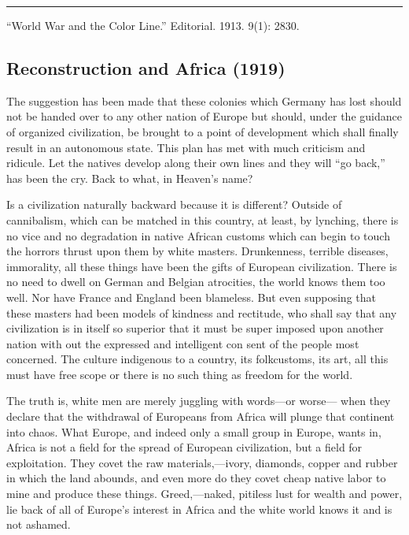 \documentclass[letterpaper,10pt,english]{jupyterBook}
\begin{document}
\bigskip\hrule\bigskip


\sphinxAtStartPar
“World War and the Color Line.” Editorial. 1913.  9(1): 28\sphinxhyphen{}30.


\subsection{Reconstruction and Africa (1919)}
\label{\detokenize{Volumes/17/04/reconstruction_and_africa:reconstruction-and-africa-1919}}\label{\detokenize{Volumes/17/04/reconstruction_and_africa::doc}}
\ignorespaces 
{}\ignorespaces 
\sphinxAtStartPar
The suggestion has been made that these colonies which Germany has lost should not be handed over to any other nation of Europe but should, under the guidance of organized civilization, be brought to a point of development which shall finally result in an autonomous state. This plan has met with much criticism and ridicule. Let the natives develop along their own lines and they will “go back,” has been the cry. Back to what, in Heaven’s name?

\sphinxAtStartPar
Is a civilization naturally backward because it is different? Outside of cannibalism, which can be matched in this country, at least, by lynching, there is no vice and no degradation in native African customs which can begin to touch the horrors thrust upon them by white masters. Drunkenness, terrible diseases, immorality, all these things have been the gifts of European civilization. There is no need to dwell on German and Belgian atrocities, the world knows them too well. Nor have France and England been blameless. But even supposing that these masters had been models of kindness and rectitude, who shall say that any civilization is in itself so superior that it must be super­ imposed upon another nation with­ out the expressed and intelligent con­ sent of the people most concerned. The culture indigenous to a country, its folk\sphinxhyphen{}customs, its art, all this must have free scope or there is no such thing as freedom for the world.

\sphinxAtStartPar
The truth is, white men are merely juggling with words—or worse— when they declare that the withdrawal of Europeans from Africa will plunge that continent into chaos. What Europe, and indeed only a small group in Europe, wants in, Africa is not a field for the spread of European civilization, but a field for exploita­tion. They covet the raw materials,—ivory, diamonds, copper and rubber in which the land abounds, and even more do they covet cheap native labor to mine and produce these things. Greed,—naked, pitiless lust for wealth and power, lie back of all of Europe’s interest in Africa and the white world knows it and is not ashamed.
\end{document}
